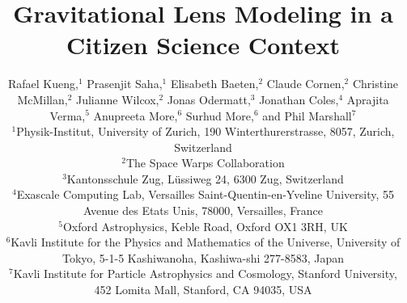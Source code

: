\documentclass[usenatbib]{mn2e}
\begin{document}
\title{Gravitational Lens Modeling in a Citizen Science Context}

\author[Kueng et al]{Rafael Kueng,$^{1}$
Prasenjit Saha,$^{1}$
Elisabeth Baeten,$^{2}$
Claude Cornen,$^{2}$
\newauthor
Christine McMillan,$^{2}$
Julianne Wilcox,$^{2}$
Jonas Odermatt,$^{3}$
Jonathan Coles,$^{4}$
\newauthor
Aprajita Verma,$^{5}$
Anupreeta More,$^{6}$
Surhud More,$^{6}$
and Phil Marshall$^{7}$ \\
$^{1}$Physik-Institut, University of Zurich, 190 Winterthurerstrasse, 8057, Zurich, Switzerland\\
$^{2}$The Space Warps Collaboration\\
$^{3}$Kantonsschule Zug, L\"ussiweg 24, 6300 Zug, Switzerland\\
$^{4}$Exascale Computing Lab, Versailles Saint-Quentin-en-Yveline University, 55 Avenue des Etats Unis, 78000, Versailles, France\\
$^{5}$Oxford Astrophysics, Keble Road, Oxford OX1 3RH, UK\\
$^{6}$Kavli Institute for the Physics and Mathematics of the Universe, University of Tokyo, 5-1-5 Kashiwanoha, Kashiwa-shi 277-8583, Japan\\
$^{7}$Kavli Institute for Particle Astrophysics and Cosmology, Stanford University, 452 Lomita Mall, Stanford, CA 94035, USA\\
}

\maketitle
\end{document}
